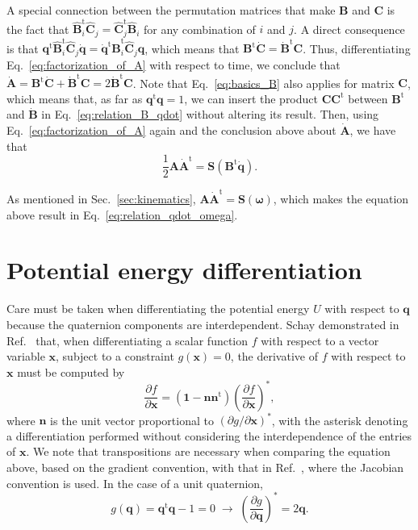 \documentclass[aip,jcp,reprint,amsmath,amssymb]{revtex4-1}
\newcommand{\mt}[1]{\boldsymbol{\mathbf{#1}}}           %
\newcommand{\vt}[1]{\boldsymbol{\mathbf{#1}}}           %
\newcommand{\tr}[1]{#1^\text{t}}                               %
\newcommand{\diff}[2]{\dfrac{\partial #1}{\partial #2}} %
\begin{document}
A special connection between the permutation matrices that make $\mt B$ and $\mt C$ is the fact that $\tr{\hat{\mt B}_i}{\hat{\mt C}_j} = \tr{\hat{\mt C}_j}{\hat{\mt B}_i}$ for any combination of $i$ and $j$. A direct consequence is that $\tr{\vt q}\tr{\hat{\mt B}}_i\hat{\mt C}_j\dot{\vt q} = \tr{\dot{\vt q}}\tr{\hat{\mt B}}_i\hat{\mt C}_j{\vt q}$, which means that $\tr{\mt B}\dot{\mt C} = \tr{\dot{\mt B}}{\mt C}$. Thus, differentiating Eq.~\ref{eq:factorization_of_A} with respect to time, we conclude that $\dot{\mt A} = \tr{\mt B}\dot{\mt C} + \tr{\dot{\mt B}}{\mt C} = 2 \tr{\dot{\mt B}}{\mt C}$. Note that Eq.~\ref{eq:basics_B} also applies for matrix $\mt C$, which means that, as far as $\tr{\vt q}\vt q = 1$, we can insert the product $\mt C\tr{\mt C}$ between $\tr{\mt B}$ and $\dot{\mt B}$ in Eq.~\ref{eq:relation_B_qdot} without altering its result. Then, using Eq.~\ref{eq:factorization_of_A} again and the conclusion above about $\dot{\mt A}$, we have that
\begin{equation}
\frac{1}{2} {\mt A}\tr{\dot{\mt A}} = {\mt S}\left( \tr{\mt B}\dot{\vt q} \right).
\end{equation}

As mentioned in Sec.~\ref{sec:kinematics}, ${\mt A}\tr{\dot{\mt A}} = \mt S(\vt \omega)$, which makes the equation above result in Eq.~\ref{eq:relation_qdot_omega}.

\section{Potential energy differentiation}
\label{sec:Diff_PotEng}

Care must be taken when differentiating the potential energy $U$ with respect to $\vt q$ because the quaternion components are interdependent. Schay demonstrated in Ref.~ that, when differentiating a scalar function $f$ with respect to a vector variable $\vt x$, subject to a constraint $g(\vt x) = 0$, the derivative of $f$ with respect to $\vt x$ must be computed by
\[
\diff{f}{\vt x} = (\vt 1 - \vt n \tr{\vt n})\left( \diff{f}{\vt x} \right)^\ast,
\]
where $\vt n$ is the unit vector proportional to $(\partial g/\partial \vt x)^\ast$, with the asterisk denoting a differentiation performed without considering the interdependence of the entries of $\vt x$. We note that transpositions are necessary when comparing the equation above, based on the gradient convention, with that in Ref.~, where the Jacobian convention is used. In the case of a unit quaternion,
\[
g(\vt q) = \tr{\vt q}\vt q - 1 = 0 \; \rightarrow \; \left(\diff{g}{\vt q}\right)^\ast = 2 \vt q.
\]
\end{document}
